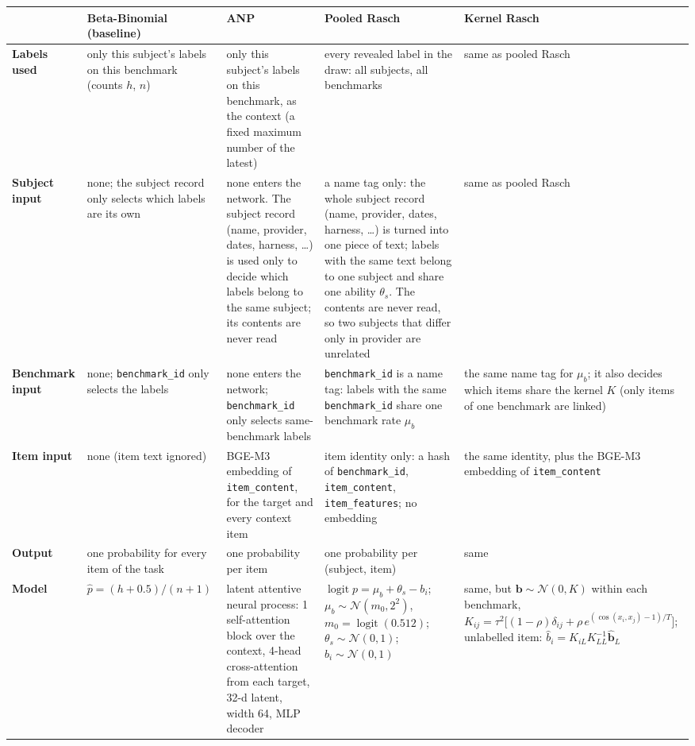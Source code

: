 \documentclass[10pt]{extarticle}
\newcommand{\code}[1]{\texttt{#1}}
\begin{document}
\begin{tabular}{@{}L{0.7in}L{1.55in}L{2.25in}L{2.45in}L{2.85in}@{}}
\toprule
& \textbf{Beta-Binomial (baseline)} & \textbf{ANP} & \textbf{Pooled Rasch} & \textbf{Kernel Rasch} \\
\midrule
\textbf{Labels used} & only this subject's labels on this benchmark (counts $h$, $n$) & only this subject's labels on this benchmark, as the context (a fixed maximum number of the latest) & every revealed label in the draw: all subjects, all benchmarks & same as pooled Rasch \\
\textbf{Subject input} & none; the subject record only selects which labels are its own & none enters the network. The subject record (name, provider, dates, harness, \dots) is used only to decide which labels belong to the same subject; its contents are never read & a name tag only: the whole subject record (name, provider, dates, harness, \dots) is turned into one piece of text; labels with the same text belong to one subject and share one ability $\theta_s$. The contents are never read, so two subjects that differ only in provider are unrelated & same as pooled Rasch \\
\textbf{Benchmark input} & none; \code{benchmark\_id} only selects the labels & none enters the network; \code{benchmark\_id} only selects same-benchmark labels & \code{benchmark\_id} is a name tag: labels with the same \code{benchmark\_id} share one benchmark rate $\mu_b$ & the same name tag for $\mu_b$; it also decides which items share the kernel $K$ (only items of one benchmark are linked) \\
\textbf{Item input} & none (item text ignored) & BGE-M3 embedding of \code{item\_content}, for the target and every context item & item identity only: a hash of \code{benchmark\_id}, \code{item\_content}, \code{item\_features}; no embedding & the same identity, plus the BGE-M3 embedding of \code{item\_content} \\
\textbf{Output} & one probability for every item of the task & one probability per item & one probability per (subject, item) & same \\
\textbf{Model} & $\hat p = (h + 0.5)/(n + 1)$ & latent attentive neural process: 1 self-attention block over the context, 4-head cross-attention from each target, 32-d latent, width 64, MLP decoder & $\operatorname{logit} p = \mu_b + \theta_s - b_i$; $\mu_b \sim \mathcal N(m_0, 2^2)$, $m_0 = \operatorname{logit}(0.512)$; $\theta_s \sim \mathcal N(0,1)$; $b_i \sim \mathcal N(0,1)$ & same, but $\mathbf b \sim \mathcal N(0,K)$ within each benchmark, $K_{ij} = \tau^2\big[(1-\rho)\delta_{ij} + \rho\, e^{(\cos(x_i,x_j)-1)/T}\big]$; unlabelled item: $\hat b_i = K_{iL}K_{LL}^{-1}\hat{\mathbf b}_L$ \\

\end{tabular}
\end{document}
